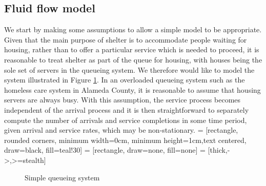 \documentclass[12pt,a4paper]{article}
\begin{document}
\subsection{Fluid flow model} \label{fluid-model}
%
We start by making some assumptions to allow a simple model to be appropriate. Given that the main purpose of shelter is to accommodate people waiting for housing, rather than to offer a particular service which is needed to proceed, it is reasonable to treat shelter as part of the queue for housing, with houses being the sole set of servers in the queueing system. We therefore would like to model the system illustrated in Figure \ref{fig:simple-q}. In an overloaded queueing system such as the homeless care system in Alameda County, it is reasonable to assume that housing servers are always busy. With this assumption, the service process becomes independent of the arrival process and it is then straightforward to separately compute the number of arrivals and service completions in some time period, given arrival and service rates, which may be non-stationary.
%
 = [rectangle, rounded corners, minimum width=0cm, minimum height=1cm,text centered, draw=black, fill=teal!30]
 = [rectangle, draw=none, fill=none]
 = [thick,->,>=stealth]
%
\begin{figure} 
  \begin{center}
    \caption{Simple queueing system} \label{fig:simple-q}
  \end{center}
\end{figure}
\end{document}
